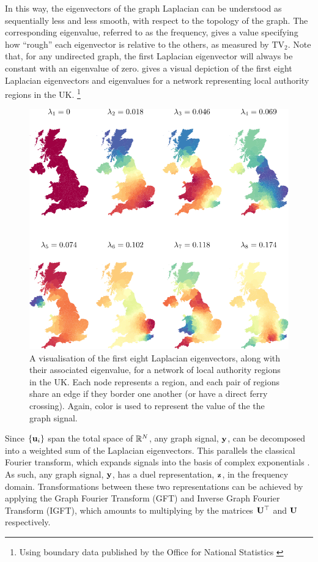 \newpage

In this way, the eigenvectors of the graph Laplacian can be understood as sequentially less and less smooth, with respect to the topology of the graph. The corresponding eigenvalue, referred to as the frequency, gives a value specifying how ``rough'' each eigenvector is relative to the others, as measured by $\text{TV}_2$. Note that, for any undirected graph, the first Laplacian eigenvector will always be constant with an eigenvalue of zero.  gives a visual depiction of the first eight Laplacian eigenvectors and eigenvalues for a network representing local authority regions in the UK. \footnote{Using boundary data published by the Office for National Statistics \citep{ONS2019}}  

\begin{figure}[t]
	\centering
		\includegraphics[width=0.85\linewidth]{Figures/uk_plot.pdf}
        \caption[A visualisation of the Laplacian eigenvectors for a network of regions in the UK]{A visualisation of the first eight Laplacian eigenvectors, along with their associated eigenvalue, for a network of local authority regions in the UK. Each node represents a region, and each pair of regions share an edge if they border one another (or have a direct ferry crossing). Again, color is used to represent the value of the the graph signal. }
	\label{fig:uk_eigs}
\end{figure}


Since $\{\mathbf{u}_i\}$ span the total space of $\mathbb{R}^N$, any graph signal, $\mathbf{y}$, can be decomposed into a weighted sum of the Laplacian eigenvectors. This parallels the classical Fourier transform, which expands signals into the basis of complex exponentials \citep{Sneddon1995}. As such, any graph signal, $\mathbf{y}$, has a duel representation, $\mathbf{z}$, in the frequency domain. Transformations between these two representations can be achieved by applying the Graph Fourier Transform (GFT) and Inverse Graph Fourier Transform (IGFT), which amounts to multiplying by the matrices $\mathbf{U}^\top$ and $\mathbf{U}$ respectively. 

